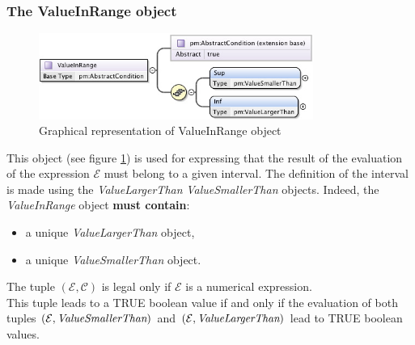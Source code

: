 \documentclass[a4paper,11pt] {ivoa}
\begin{document}
\subsubsection{The ValueInRange object}
\begin{figure}[htbp]
\begin{center}
\includegraphics[width=0.8\textwidth]{pictures/ValueInRange.jpg} 
\caption{Graphical representation of ValueInRange object}
\label{Pic-ValueInRange}
\end{center}
\end{figure}
This object (see figure \ref{Pic-ValueInRange}) is used for expressing that the result of the
evaluation of the expression $\mathcal E$ must belong to a given interval. The definition of the
interval is made using the {\it ValueLargerThan} {\it ValueSmallerThan} objects.
Indeed, the {\it ValueInRange} object {\bf must contain}:
\begin{itemize}
\item a unique {\it ValueLargerThan} object,
\item a unique {\it ValueSmallerThan} object. 
\end{itemize}
The tuple $(\mathcal E, \mathcal C)$ is legal only if $\mathcal E$ is a numerical expression.\\
This tuple leads to a TRUE boolean value if and only if the evaluation of both tuples $(\mathcal E,
\mbox{\it ValueSmallerThan})$ and $(\mathcal E, \mbox{\it ValueLargerThan})$ lead to TRUE boolean
values.


\end{document}

